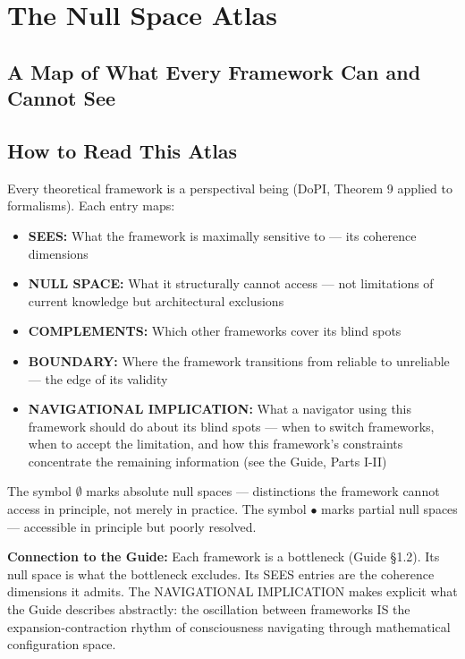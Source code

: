 \chapter*{The Null Space Atlas}


\section*{A Map of What Every Framework Can and Cannot See}



\bigskip\noindent\makebox[\textwidth]{\color{rulegray}\rule{5cm}{0.3pt}}\bigskip


\section*{How to Read This Atlas}


Every theoretical framework is a perspectival being (DoPI, Theorem 9 applied to formalisms). Each entry maps:


\begin{itemize}[nosep,leftmargin=*]
  \item \textbf{SEES:} What the framework is maximally sensitive to — its coherence dimensions
  \item \textbf{NULL SPACE:} What it structurally cannot access — not limitations of current knowledge but architectural exclusions
  \item \textbf{COMPLEMENTS:} Which other frameworks cover its blind spots
  \item \textbf{BOUNDARY:} Where the framework transitions from reliable to unreliable — the edge of its validity
  \item \textbf{NAVIGATIONAL IMPLICATION:} What a navigator using this framework should do about its blind spots — when to switch frameworks, when to accept the limitation, and how this framework's constraints concentrate the remaining information (see the Guide, Parts I-II)
\end{itemize}


The symbol $\emptyset$ marks absolute null spaces — distinctions the framework cannot access in principle, not merely in practice. The symbol $\bullet$ marks partial null spaces — accessible in principle but poorly resolved.


\textbf{Connection to the Guide:} Each framework is a bottleneck (Guide §1.2). Its null space is what the bottleneck excludes. Its SEES entries are the coherence dimensions it admits. The NAVIGATIONAL IMPLICATION makes explicit what the Guide describes abstractly: the oscillation between frameworks IS the expansion-contraction rhythm of consciousness navigating through mathematical configuration space.


